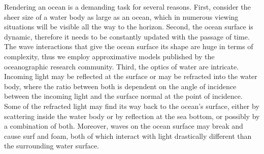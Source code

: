 Rendering an ocean is a demanding task for several reasons. First, consider the
sheer size of a water body as large as an ocean, which in numerous viewing
situations will be visible all the way to the horizon. Second, the ocean surface
is dynamic, therefore it needs to be constantly updated with the passage of time.
The wave interactions that give the ocean surface its shape are huge in terms of
complexity, thus we employ approximative models published by the oceanographic
research community.
Third, the optics of water are intricate. Incoming light may be reflected at the
surface or may be refracted into the water body, where the ratio between both is
dependent on the angle of incidence between the incoming light and the surface
normal at the point of incidence. Some of the refracted light may find its way
back to the ocean's surface, either by scattering inside the water body or by
reflection at the sea bottom, or possibly by a combination of both. Moreover,
waves on the ocean surface may break and cause surf and foam, both of which
interact with light drastically different than the surrounding water surface.




% 
% 

